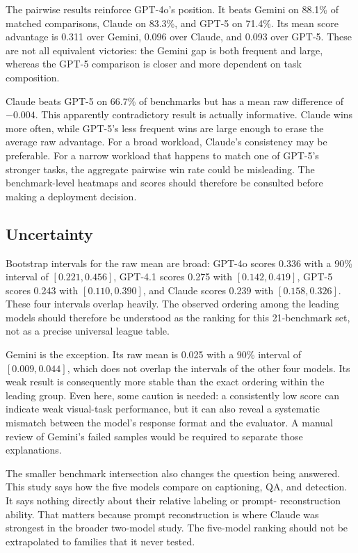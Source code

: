 ﻿\documentclass[11pt,a4paper]{article}
\begin{document}
The pairwise results reinforce GPT-4o's position. It beats Gemini on 88.1\%
of matched comparisons, Claude on 83.3\%, and GPT-5 on 71.4\%. Its mean score
advantage is 0.311 over Gemini, 0.096 over Claude, and 0.093 over GPT-5.
These are not all equivalent victories: the Gemini gap is both frequent and
large, whereas the GPT-5 comparison is closer and more dependent on task
composition.

Claude beats GPT-5 on 66.7\% of benchmarks but has a mean raw difference of
\(-0.004\). This apparently contradictory result is actually informative.
Claude wins more often, while GPT-5's less frequent wins are large enough to
erase the average raw advantage. For a broad workload, Claude's consistency
may be preferable. For a narrow workload that happens to match one of
GPT-5's stronger tasks, the aggregate pairwise win rate could be misleading.
The benchmark-level heatmaps and scores should therefore be consulted before
making a deployment decision.

\subsection{Uncertainty}

Bootstrap intervals for the raw mean are broad: GPT-4o scores 0.336 with a
90\% interval of \([0.221, 0.456]\), GPT-4.1 scores 0.275 with
\([0.142, 0.419]\), GPT-5 scores 0.243 with \([0.110, 0.390]\), and Claude
scores 0.239 with \([0.158, 0.326]\). These four intervals overlap heavily.
The observed ordering among the leading models should therefore be understood
as the ranking for this 21-benchmark set, not as a precise universal league
table.

Gemini is the exception. Its raw mean is 0.025 with a 90\% interval of
\([0.009, 0.044]\), which does not overlap the intervals of the other four
models. Its weak result is consequently more stable than the exact ordering
within the leading group. Even here, some caution is needed: a consistently
low score can indicate weak visual-task performance, but it can also reveal a
systematic mismatch between the model's response format and the evaluator.
A manual review of Gemini's failed samples would be required to separate
those explanations.

The smaller benchmark intersection also changes the question being answered.
This study says how the five models compare on captioning, QA, and detection.
It says nothing directly about their relative labeling or prompt-
reconstruction ability. That matters because prompt reconstruction is where
Claude was strongest in the broader two-model study. The five-model ranking
should not be extrapolated to families that it never tested.
\end{document}
